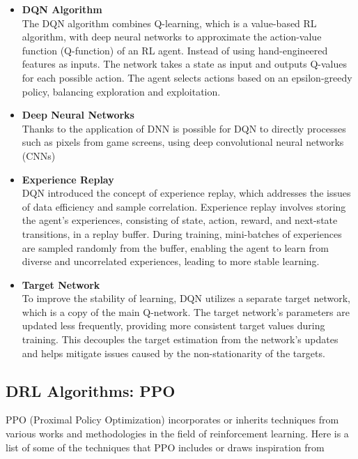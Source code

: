 \begin{itemize}

\item {\bf DQN Algorithm }\\
The DQN algorithm combines Q-learning, which is a value-based RL algorithm, with deep neural networks to approximate the action-value function (Q-function) of an RL agent. Instead of using hand-engineered features as inputs. The network takes a state as input and outputs Q-values for each possible action. The agent selects actions based on an epsilon-greedy policy, balancing exploration and exploitation.

\item {\bf Deep Neural Networks }\\
Thanks to the application of DNN is possible for DQN to directly processes such as pixels from game screens, using deep convolutional neural networks (CNNs)

\item {\bf Experience Replay }\\
DQN introduced the concept of experience replay, which addresses the issues of data efficiency and sample correlation. Experience replay involves storing the agent's experiences, consisting of state, action, reward, and next-state transitions, in a replay buffer. During training, mini-batches of experiences are sampled randomly from the buffer, enabling the agent to learn from diverse and uncorrelated experiences, leading to more stable learning.

\item {\bf Target Network }\\
To improve the stability of learning, DQN utilizes a separate target network, which is a copy of the main Q-network. The target network's parameters are updated less frequently, providing more consistent target values during training. This decouples the target estimation from the network's updates and helps mitigate issues caused by the non-stationarity of the targets.
\end{itemize}


\subsection{DRL Algorithms: PPO}
\begin{textblock}
PPO (Proximal Policy Optimization) incorporates or inherits techniques from various works and methodologies in the field of reinforcement learning. Here is a list of some of the techniques that PPO includes or draws inspiration from
\end{textblock}

